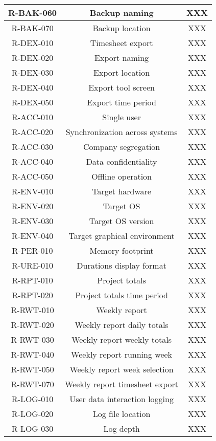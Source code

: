 \begin{longtable}{| c | c | c |}
  R-BAK-060 & Backup naming & XXX \\ \hline
  R-BAK-070 & Backup location & XXX \\ \hline
  R-DEX-010 & Timesheet export & XXX \\ \hline
  R-DEX-020 & Export naming & XXX \\ \hline
  R-DEX-030 & Export location & XXX \\ \hline
  R-DEX-040 & Export tool screen & XXX \\ \hline
  R-DEX-050 & Export time period & XXX \\ \hline
  R-ACC-010 & Single user & XXX \\ \hline
  R-ACC-020 & Synchronization across systems & XXX \\ \hline
  R-ACC-030 & Company segregation & XXX \\ \hline
  R-ACC-040 & Data confidentiality & XXX \\ \hline
  R-ACC-050 & Offline operation & XXX \\ \hline
  R-ENV-010 & Target hardware & XXX \\ \hline
  R-ENV-020 & Target OS & XXX \\ \hline
  R-ENV-030 & Target OS version & XXX \\ \hline
  R-ENV-040 & Target graphical environment & XXX \\ \hline
  R-PER-010 & Memory footprint & XXX \\ \hline
  R-URE-010 & Durations display format & XXX \\ \hline
  R-RPT-010 & Project totals & XXX \\ \hline
  R-RPT-020 & Project totals time period & XXX \\ \hline
  R-RWT-010 & Weekly report & XXX \\ \hline
  R-RWT-020 & Weekly report daily totals & XXX \\ \hline
  R-RWT-030 & Weekly report weekly totals & XXX \\ \hline
  R-RWT-040 & Weekly report running week & XXX \\ \hline
  R-RWT-050 & Weekly report week selection & XXX \\ \hline
  R-RWT-070 & Weekly report timesheet export & XXX \\ \hline
  R-LOG-010 & User data interaction logging & XXX \\ \hline
  R-LOG-020 & Log file location & XXX \\ \hline
  R-LOG-030 & Log depth & XXX \\ \hline

\end{longtable}
